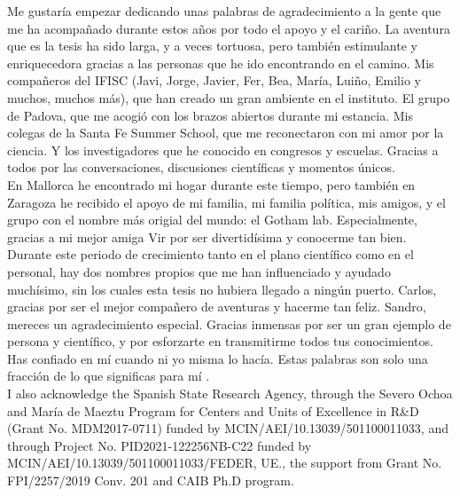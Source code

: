 Me gustaría empezar dedicando unas palabras de agradecimiento a la gente que me ha acompañado durante estos años por todo el apoyo y el cariño. La aventura que es la tesis ha sido larga, y a veces tortuosa, pero también estimulante y enriquecedora gracias a las personas que he ido encontrando en el camino. Mis compañeros del IFISC (Javi, Jorge, Javier, Fer, Bea, María, Luiño, Emilio y muchos, muchos más), que han creado un gran ambiente en el instituto. El grupo de Padova, que me acogió con los brazos abiertos durante mi estancia. Mis colegas de la Santa Fe Summer School, que me reconectaron con mi amor por la ciencia. Y los investigadores que he conocido en congresos y escuelas. Gracias a todos por las conversaciones, discusiones científicas y momentos únicos. \\

En Mallorca he encontrado mi hogar durante este tiempo, pero también en Zaragoza he recibido el apoyo de mi familia, mi familia política, mis amigos, y el grupo con el nombre más origial del mundo: el Gotham lab. Especialmente, gracias a mi mejor amiga Vir por ser divertidísima y conocerme tan bien. \\

Durante este periodo de crecimiento tanto en el plano científico como en el personal, hay dos nombres propios que me han influenciado y ayudado muchísimo, sin los cuales esta tesis no hubiera llegado a ningún puerto. Carlos, gracias por ser el mejor compañero de aventuras y hacerme tan feliz. Sandro, mereces un agradecimiento especial.  Gracias inmensas por ser un gran ejemplo de persona y científico, y por esforzarte en transmitirme todos tus conocimientos. Has confiado en mí cuando ni yo misma lo hacía. Estas palabras son solo una fracción de lo que significas para mí . \\

I also acknowledge the Spanish State Research Agency, through the Severo Ochoa and María de Maeztu Program for Centers and Units of Excellence in R\&D (Grant No. MDM2017-0711) \newline funded by MCIN/AEI/10.13039/501100011033, and through \newline Project No. PID2021-122256NB-C22 funded by \newline MCIN/AEI/10.13039/501100011033/FEDER, UE., the support from Grant No. FPI/2257/2019 Conv. 201 and CAIB Ph.D program.



